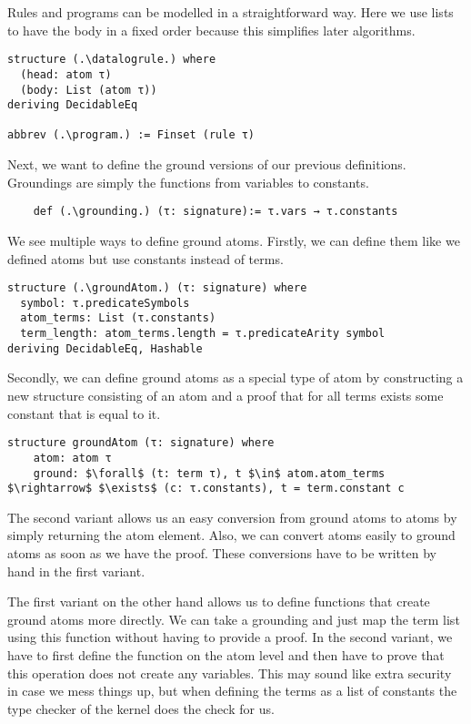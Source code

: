 Rules and programs can be modelled in a straightforward way. Here we use lists to have the body in a fixed order because this simplifies later algorithms.

\begin{lstlisting}
structure (.\datalogrule.) where
  (head: atom τ)
  (body: List (atom τ))
deriving DecidableEq

abbrev (.\program.) := Finset (rule τ)
\end{lstlisting}

Next, we want to define the ground versions of our previous definitions. Groundings are simply the functions from variables to constants.

\begin{lstlisting}
    def (.\grounding.) (τ: signature):= τ.vars → τ.constants
\end{lstlisting}

We see multiple ways to define ground atoms. Firstly, we can define them like we defined atoms but use constants instead of terms. 

\begin{lstlisting}
structure (.\groundAtom.) (τ: signature) where
  symbol: τ.predicateSymbols
  atom_terms: List (τ.constants)
  term_length: atom_terms.length = τ.predicateArity symbol
deriving DecidableEq, Hashable
\end{lstlisting}

Secondly, we can define ground atoms as a special type of atom by constructing a new structure consisting of an atom and a proof that for all terms exists some constant that is equal to it.

\begin{lstlisting}
structure groundAtom (τ: signature) where
    atom: atom τ
    ground: $\forall$ (t: term τ), t $\in$ atom.atom_terms $\rightarrow$ $\exists$ (c: τ.constants), t = term.constant c
\end{lstlisting}

The second variant allows us an easy conversion from ground atoms to atoms by simply returning the atom element. Also, we can convert atoms easily to ground atoms as soon as we have the proof. These conversions have to be written by hand in the first variant.

The first variant on the other hand allows us to define functions that create ground atoms more directly. We can take a grounding and just map the term list using this function without having to provide a proof. In the second variant, we have to first define the function on the atom level and then have to prove that this operation does not create any variables. This may sound like extra security in case we mess things up, but when defining the terms as a list of constants the type checker of the kernel does the check for us.

